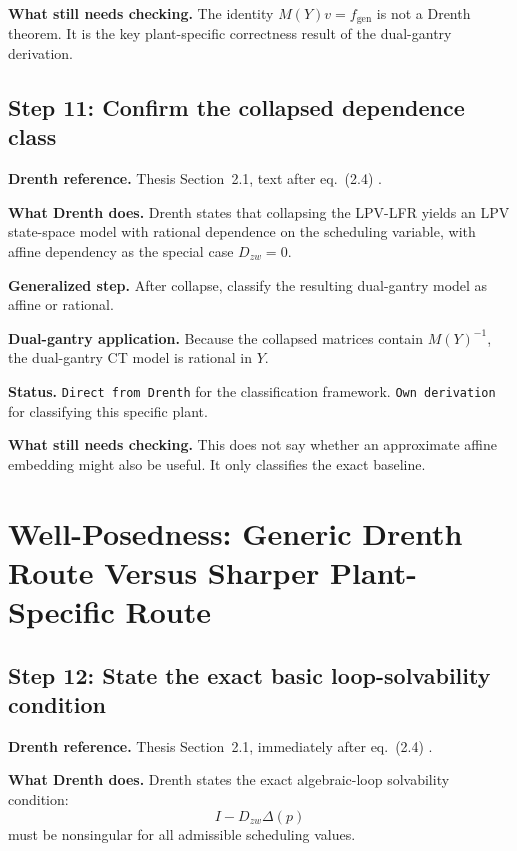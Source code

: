 \documentclass[11pt]{article}
\newcommand{\audititem}[2]{\par\smallskip\noindent\textbf{#1.} #2\par}
\newcommand{\statusline}[1]{\texttt{#1}}
\begin{document}
\audititem{What still needs checking}{The identity $M(Y)v = f_{\mathrm{gen}}$
is not a Drenth theorem. It is the key plant-specific correctness result of the
dual-gantry derivation.}

\subsection{Step 11: Confirm the collapsed dependence class}

\audititem{Drenth reference}{Thesis Section~2.1, text after eq.~(2.4)
\cite{drenth2025thesis}.}

\audititem{What Drenth does}{Drenth states that collapsing the LPV-LFR yields an
LPV state-space model with rational dependence on the scheduling variable, with
affine dependency as the special case $D_{zw}=0$.}

\audititem{Generalized step}{After collapse, classify the resulting dual-gantry
model as affine or rational.}

\audititem{Dual-gantry application}{Because the collapsed matrices contain
$M(Y)^{-1}$, the dual-gantry CT model is rational in $Y$.}

\audititem{Status}{\statusline{Direct from Drenth} for the classification
framework. \statusline{Own derivation} for classifying this specific plant.}

\audititem{What still needs checking}{This does not say whether an approximate
affine embedding might also be useful. It only classifies the exact baseline.}

\section{Well-Posedness: Generic Drenth Route Versus Sharper Plant-Specific Route}

\subsection{Step 12: State the exact basic loop-solvability condition}

\audititem{Drenth reference}{Thesis Section~2.1, immediately after eq.~(2.4)
\cite{drenth2025thesis}.}

\audititem{What Drenth does}{Drenth states the exact algebraic-loop solvability
condition:
\[
I - D_{zw}\Delta(p)
\]
must be nonsingular for all admissible scheduling values.}
\end{document}
